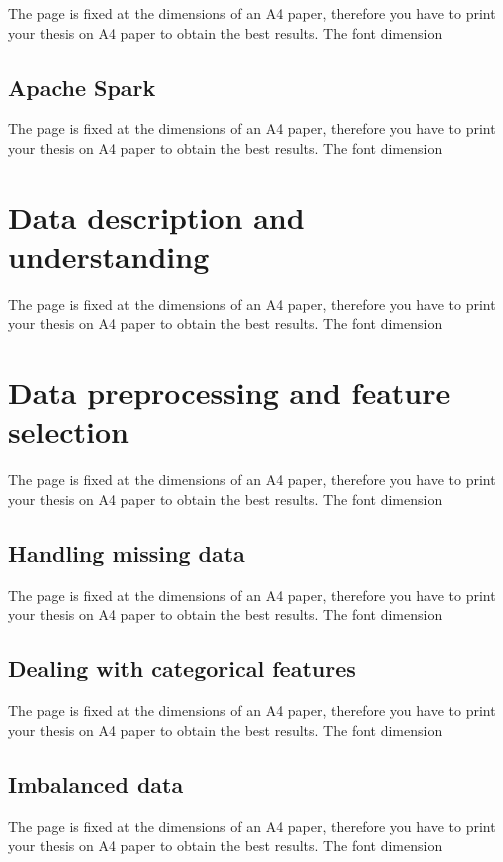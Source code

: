 \documentclass[LaM,binding=0.6cm, english]{sapthesis}
\begin{document}
The page is fixed at the dimensions of an A4 paper, therefore you have to print your thesis on A4 paper to obtain the best results. The font dimension


\subsection{Apache Spark}

The page is fixed at the dimensions of an A4 paper, therefore you have to print your thesis on A4 paper to obtain the best results. The font dimension

\section{Data description and understanding}

The page is fixed at the dimensions of an A4 paper, therefore you have to print your thesis on A4 paper to obtain the best results. The font dimension

\section{Data preprocessing and feature selection}

The page is fixed at the dimensions of an A4 paper, therefore you have to print your thesis on A4 paper to obtain the best results. The font dimension

\subsection{Handling missing data}

The page is fixed at the dimensions of an A4 paper, therefore you have to print your thesis on A4 paper to obtain the best results. The font dimension

\subsection{Dealing with categorical features}

The page is fixed at the dimensions of an A4 paper, therefore you have to print your thesis on A4 paper to obtain the best results. The font dimension

\subsection{Imbalanced data}

The page is fixed at the dimensions of an A4 paper, therefore you have to print your thesis on A4 paper to obtain the best results. The font dimension
\end{document}
